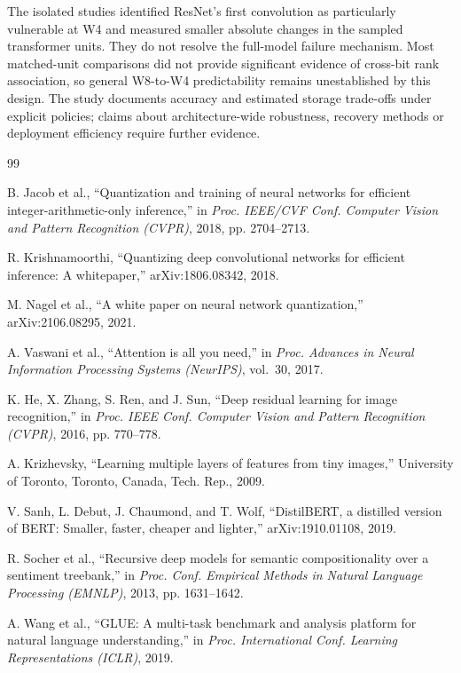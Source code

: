 \documentclass[conference]{IEEEtran}
\begin{document}
The isolated studies identified ResNet's first convolution as particularly vulnerable at W4 and measured smaller absolute changes in the sampled transformer units. They do not resolve the full-model failure mechanism. Most matched-unit comparisons did not provide significant evidence of cross-bit rank association, so general W8-to-W4 predictability remains unestablished by this design. The study documents accuracy and estimated storage trade-offs under explicit policies; claims about architecture-wide robustness, recovery methods or deployment efficiency require further evidence.


\balance
\begin{thebibliography}{99}

B. Jacob et al., ``Quantization and training of neural networks for efficient integer-arithmetic-only inference,'' in \emph{Proc. IEEE/CVF Conf. Computer Vision and Pattern Recognition (CVPR)}, 2018, pp. 2704--2713.

R. Krishnamoorthi, ``Quantizing deep convolutional networks for efficient inference: A whitepaper,'' arXiv:1806.08342, 2018.

M. Nagel et al., ``A white paper on neural network quantization,'' arXiv:2106.08295, 2021.

A. Vaswani et al., ``Attention is all you need,'' in \emph{Proc. Advances in Neural Information Processing Systems (NeurIPS)}, vol.~30, 2017.

K. He, X. Zhang, S. Ren, and J. Sun, ``Deep residual learning for image recognition,'' in \emph{Proc. IEEE Conf. Computer Vision and Pattern Recognition (CVPR)}, 2016, pp. 770--778.

A. Krizhevsky, ``Learning multiple layers of features from tiny images,'' University of Toronto, Toronto, Canada, Tech. Rep., 2009.

V. Sanh, L. Debut, J. Chaumond, and T. Wolf, ``DistilBERT, a distilled version of BERT: Smaller, faster, cheaper and lighter,'' arXiv:1910.01108, 2019.

R. Socher et al., ``Recursive deep models for semantic compositionality over a sentiment treebank,'' in \emph{Proc. Conf. Empirical Methods in Natural Language Processing (EMNLP)}, 2013, pp. 1631--1642.

A. Wang et al., ``GLUE: A multi-task benchmark and analysis platform for natural language understanding,'' in \emph{Proc. International Conf. Learning Representations (ICLR)}, 2019.


\end{thebibliography}
\end{document}
